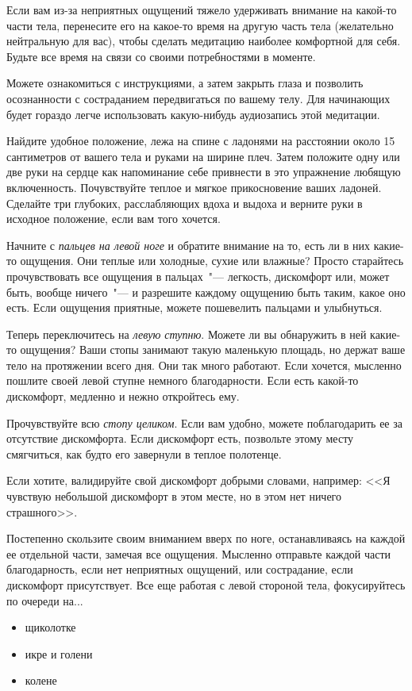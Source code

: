 Если вам из-за неприятных ощущений тяжело удерживать внимание на какой-то части тела, перенесите его на какое-то время на другую часть тела (желательно нейтральную для вас), чтобы сделать медитацию наиболее комфортной для себя. Будьте все время на связи со своими потребностями в моменте.

Можете ознакомиться с инструкциями, а затем закрыть глаза и позволить осознанности с состраданием передвигаться по вашему телу. Для начинающих будет гораздо легче использовать какую-нибудь аудиозапись этой медитации.

\begin{itemize}
	\itemdiamondsuit Найдите удобное положение, лежа на спине с ладонями на расстоянии около 15 сантиметров от вашего тела и руками на ширине плеч. Затем положите одну или две руки на сердце как напоминание себе привнести в это упражнение любящую включенность. Почувствуйте теплое и мягкое прикосновение ваших ладоней. Сделайте три глубоких, расслабляющих вдоха и выдоха и верните руки в исходное положение, если вам того хочется. 
	
	\itemdiamondsuit Начните с \emph{пальцев на левой ноге} и обратите внимание на то, есть ли в них какие-то ощущения. Они теплые или холодные, сухие или влажные? Просто старайтесь прочувствовать все ощущения в пальцах~"--- легкость, дискомфорт или, может быть, вообще ничего~"--- и разрешите каждому ощущению быть таким, какое оно есть. Если ощущения приятные, можете пошевелить пальцами и улыбнуться.
	
	\itemdiamondsuit Теперь переключитесь на \emph{левую ступню}. Можете ли вы обнаружить в ней какие-то ощущения? Ваши стопы занимают такую маленькую площадь, но держат ваше тело на протяжении всего дня. Они так много работают. Если хочется, мысленно пошлите своей левой ступне немного благодарности. Если есть какой-то дискомфорт, медленно и нежно откройтесь ему.
	
	\itemdiamondsuit Прочувствуйте всю \emph{стопу целиком}. Если вам удобно, можете поблагодарить ее за отсутствие дискомфорта. Если дискомфорт есть, позвольте этому месту смягчиться, как будто его завернули в теплое полотенце.
	
	\itemdiamondsuit Если хотите, валидируйте свой дискомфорт добрыми словами, например: <<Я чувствую небольшой дискомфорт в этом месте, но в этом нет ничего страшного>>.
	
	\itemdiamondsuit Постепенно скользите своим вниманием вверх по ноге, останавливаясь на каждой ее отдельной части, замечая все ощущения. Мысленно отправьте каждой части благодарность, если нет неприятных ощущений, или сострадание, если дискомфорт присутствует. Все еще работая с левой стороной тела, фокусируйтесь по очереди на...
	\begin{itemize}
		\item щиколотке
		\item икре и голени
		\item колене
	\end{itemize}
	

\end{itemize}
